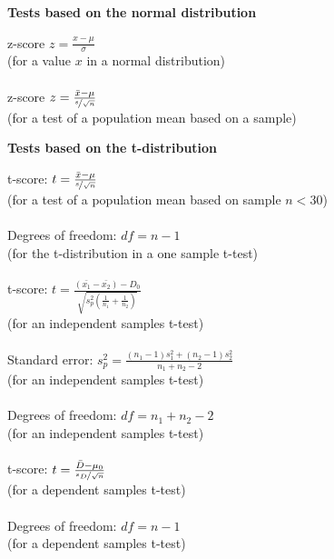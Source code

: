 \hfill\vline\hfill
\begin{minipage}[t]{.45\textwidth}
\begin{center}
    \textbf{Tests based on the normal distribution}
\end{center}
\hline
\answerskip
z-score \hfill $z = \frac{x - \mu}{\sigma}$\\
{\scriptsize (for a value $x$ in a normal distribution)} \\
\\
z-score \hfill $z = \frac{\bar{x} - \mu}{\nicefrac{s}{\sqrt{n}}}$\\
{\scriptsize (for a test of a population mean based on a sample)} \\
\begin{center}
    \textbf{Tests based on the t-distribution}
\end{center}
\hline
\answerskip
t-score: \hfill $t = \frac{\bar{x} - \mu}{\nicefrac{s}{\sqrt{n}}}$\\
{\scriptsize (for a test of a population mean based on sample $n < 30$)} \\
\\
Degrees of freedom: \hfill $df = n - 1$\\
{\scriptsize (for the t-distribution in a one sample t-test)} \\
\\
t-score: \hfill $t = \frac{(\bar{x_1} - \bar{x_2}) - D_0}
{\sqrt{s^2_p (\frac{1}{n_1} + \frac{1}{n_2})}}$\\
{\scriptsize (for an independent samples t-test)} \\
\\
Standard error: \hfill $s^2_p = \frac{(n_1 - 1) s^2_1 + (n_2 - 1) s^2_2}{n_1 + n_2 - 2}$\\
{\scriptsize (for an independent samples t-test)} \\
\\
Degrees of freedom: \hfill $df = n_1 + n_2 - 2$\\
{\scriptsize (for an independent samples t-test)} \\
\\
t-score: \hfill $t = \frac{\bar{D} - \mu_0}
{\nicefrac{s_D}{\sqrt{n}}}$\\
{\scriptsize (for a dependent samples t-test)} \\
\\
Degrees of freedom: \hfill $df =n - 1$\\
{\scriptsize (for a dependent samples t-test)} \\
\\

\end{minipage}
